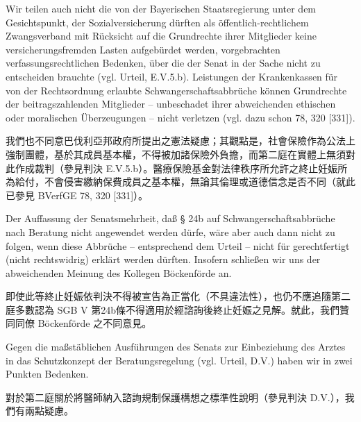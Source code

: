 \documentclass[12pt]{article}
\begin{document}
\begin{sourcepara}[title={原文SondervotumMS.309}]
Wir teilen auch nicht die von der Bayerischen Staatsregierung unter dem Gesichtspunkt, der Sozialversicherung dürften als öffentlich-rechtlichem Zwangsverband mit Rücksicht auf die Grundrechte ihrer Mitglieder keine versicherungsfremden Lasten aufgebürdet werden, vorgebrachten verfassungsrechtlichen Bedenken, über die der Senat in der Sache nicht zu entscheiden brauchte (vgl. Urteil, E.V.5.b). Leistungen der Krankenkassen für von der Rechtsordnung erlaubte Schwangerschaftsabbrüche können Grundrechte der beitragszahlenden Mitglieder -- unbeschadet ihrer abweichenden ethischen oder moralischen Überzeugungen -- nicht verletzen (vgl. dazu schon \abbrBVerfGE{} 78, 320 [331]).
\end{sourcepara}
\begin{transpara}
我們也不同意巴伐利亞邦政府所提出之憲法疑慮；其觀點是，社會保險作為公法上強制團體，基於其成員基本權，不得被加諸保險外負擔，而第二庭在實體上無須對此作成裁判（參見判決 E.V.5.b）。醫療保險基金對法律秩序所允許之終止妊娠所為給付，不會侵害繳納保費成員之基本權，無論其倫理或道德信念是否不同（就此已參見 BVerfGE 78, 320 [331]）。
\end{transpara}

\begin{sourcepara}[title={原文SondervotumMS.310}]
Der Auffassung der Senatsmehrheit, daß § 24b \abbrSGBV{} auf Schwangerschaftsabbrüche nach Beratung nicht angewendet werden dürfe, wäre aber auch dann nicht zu folgen, wenn diese Abbrüche -- entsprechend dem Urteil -- nicht für gerechtfertigt (nicht rechtswidrig) erklärt werden dürften. Insofern schließen wir uns der abweichenden Meinung des Kollegen Böckenförde an.
\end{sourcepara}
\begin{transpara}
即使此等終止妊娠依判決不得被宣告為正當化（不具違法性），也仍不應追隨第二庭多數認為 SGB V 第24b條不得適用於經諮詢後終止妊娠之見解。就此，我們贊同同僚 Böckenförde 之不同意見。
\end{transpara}


\begin{sourcepara}[title={原文SondervotumMS.311}]
Gegen die maßstäblichen Ausführungen des Senats zur Einbeziehung des Arztes in das Schutzkonzept der Beratungsregelung (vgl. Urteil, D.V.) haben wir in zwei Punkten Bedenken.
\end{sourcepara}
\begin{transpara}
對於第二庭關於將醫師納入諮詢規制保護構想之標準性說明（參見判決 D.V.），我們有兩點疑慮。
\end{transpara}
\end{document}
